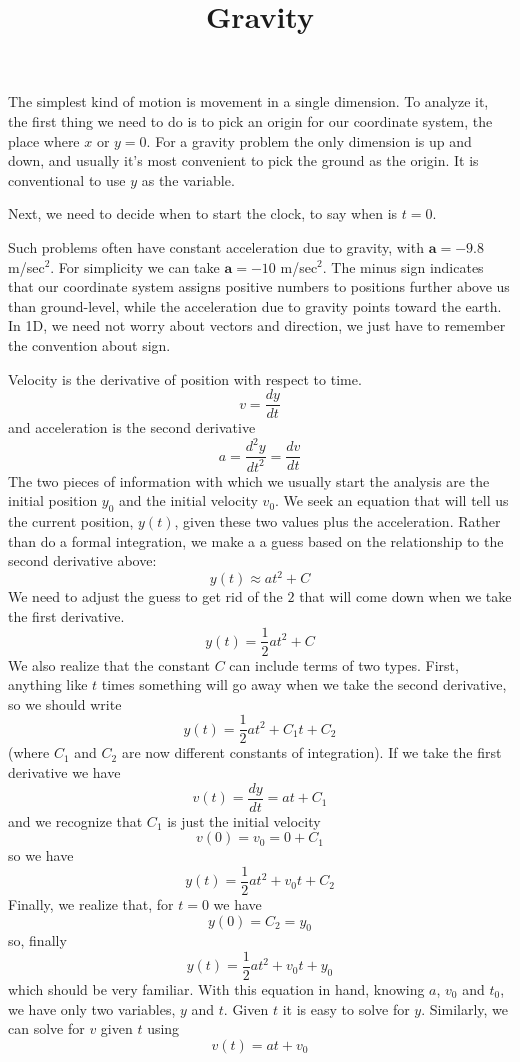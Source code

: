 \documentclass[11pt, oneside]{article}
\title{Gravity}
\date{}
\begin{document}
\maketitle
\Large

\label{sec:Falling_bodies}

The simplest kind of motion is movement in a single dimension.  To analyze it, the first thing we need to do is to pick an origin for our coordinate system, the place where $x$ or $y=0$.  For a gravity problem the only dimension is up and down, and usually it's most convenient to pick the ground as the origin.  It is conventional to use $y$ as the variable.

Next, we need to decide when to start the clock, to say when is $t=0$.

Such problems often have constant acceleration due to gravity, with $\mathbf{a}=-9.8$ m/sec$^2$.  For simplicity we can take $\mathbf{a}=-10$ m/sec$^2$.  The minus sign indicates that our coordinate system assigns positive numbers to positions further above us than ground-level, while the acceleration due to gravity points toward the earth.  In 1D, we need not worry about vectors and direction, we just have to remember the convention about sign.

Velocity is the derivative of position with respect to time.
\[ v = \frac{dy}{dt} \]
and acceleration is the second derivative
\[ a = \frac{d^2y}{dt^2} = \frac{dv}{dt} \]
The two pieces of information with which we usually start the analysis are the initial position $y_0$ and the initial velocity $v_0$.  We seek an equation that will tell us the current position, $y(t)$, given these two values plus the acceleration.  Rather than do a formal integration, we make a a guess based on the relationship to the second derivative above:
\[ y(t) \approx at^2 + C \]
We need to adjust the guess to get rid of the $2$ that will come down when we take the first derivative.
\[ y(t) = \frac{1}{2}at^2 + C \]
We also realize that the constant $C$ can include terms of two types.  First, anything like $t$ times something will go away when we take the second derivative, so we should write
\[ y(t) = \frac{1}{2}at^2 + C_1t + C_2 \]
(where $C_1$ and $C_2$ are now different constants of integration).  If we take the first derivative we have
\[ v(t) = \frac{dy}{dt} = at + C_1 \]
and we recognize that $C_1$ is just the initial velocity
\[ v(0) = v_0 = 0 + C_1 \]
so we have
\[ y(t) = \frac{1}{2}at^2 + v_0t + C_2 \]
Finally, we realize that, for $t=0$ we have
\[ y(0) = C_2 = y_0 \]
so, finally
\[ y(t) = \frac{1}{2}at^2 + v_0t + y_0 \]
which should be very familiar.  With this equation in hand, knowing $a$, $v_0$ and $t_0$, we have only two variables, $y$ and $t$.  Given $t$ it is easy to solve for $y$.  Similarly, we can solve for $v$ given $t$ using
\[ v(t) = at + v_0 \]
\end{document}
